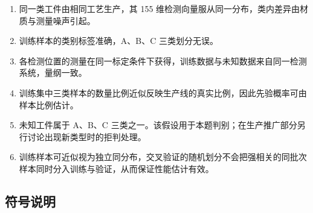\documentclass[12pt,a4paper]{article}
\begin{document}
\begin{enumerate}[label=(\arabic*),leftmargin=2.4em]
\item 同一类工件由相同工艺生产，其 155 维检测向量服从同一分布，类内差异由材质与测量噪声引起。
\item 训练样本的类别标签准确，A、B、C 三类划分无误。
\item 各检测位置的测量在同一标定条件下获得，训练数据与未知数据来自同一检测系统，量纲一致。
\item 训练集中三类样本的数量比例近似反映生产线的真实比例，因此先验概率可由样本比例估计。
\item 未知工件属于 A、B、C 三类之一。该假设用于本题判别；在生产推广部分另行讨论出现新类型时的拒判处理。
\item 训练样本可近似视为独立同分布，交叉验证的随机划分不会把强相关的同批次样本同时分入训练与验证，从而保证性能估计有效。
\end{enumerate}

\subsection{符号说明}
\end{document}
